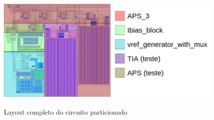 \begin{figure}[!h]
 \centering
    \caption{Layout completo do circuito particionado} 
    \includegraphics[scale=0.4]{Resultados/Imagens/Image_CircuitoCompleto.png}
    \label{layoutcompleto_division}
\end{figure}


